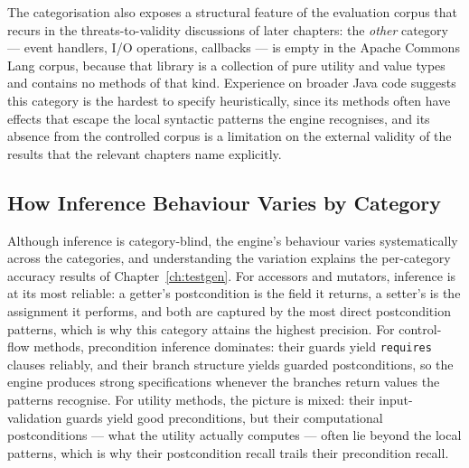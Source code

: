 The categorisation also exposes a structural feature of the evaluation corpus
that recurs in the threats-to-validity discussions of later chapters: the
\emph{other} category --- event handlers, I/O operations, callbacks --- is
empty in the Apache Commons Lang corpus, because that library is a collection
of pure utility and value types and contains no methods of that kind.
Experience on broader Java code suggests this category is the hardest to
specify heuristically, since its methods often have effects that escape the
local syntactic patterns the engine recognises, and its absence from the
controlled corpus is a limitation on the external validity of the results that
the relevant chapters name explicitly.

\subsection{How Inference Behaviour Varies by Category}

Although inference is category-blind, the engine's behaviour varies
systematically across the categories, and understanding the variation explains the
per-category accuracy results of Chapter~\ref{ch:testgen}. For accessors and
mutators, inference is at its most reliable: a getter's postcondition is the field
it returns, a setter's is the assignment it performs, and both are captured by the
most direct postcondition patterns, which is why this category attains the highest
precision. For control-flow methods, precondition inference dominates: their guards
yield \texttt{requires} clauses reliably, and their branch structure yields guarded
postconditions, so the engine produces strong specifications whenever the branches
return values the patterns recognise. For utility methods, the picture is mixed:
their input-validation guards yield good preconditions, but their computational
postconditions --- what the utility actually computes --- often lie beyond the
local patterns, which is why their postcondition recall trails their precondition
recall.

